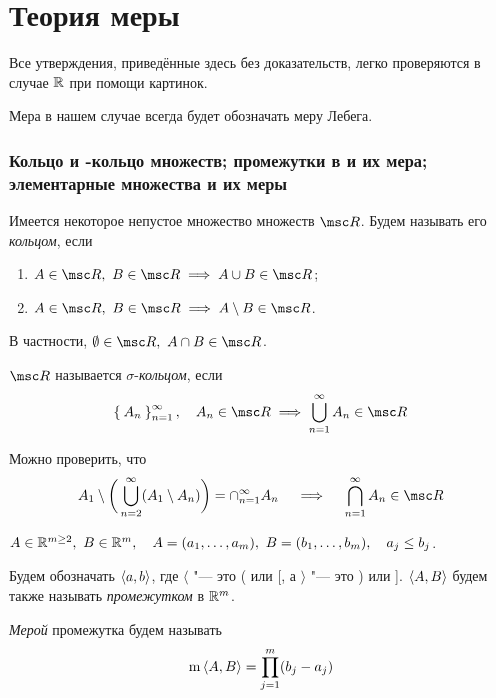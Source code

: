 \part{Теория меры}

Все утверждения, приведённые здесь без доказательств, легко проверяются в случае $ \mathbb{R} $ при помощи картинок.

Мера в нашем случае всегда будет обозначать меру Лебега.

\section{Кольцо и -кольцо множеств; промежутки в  и их мера; элементарные множества и их меры}

\begin{definition}
	Имеется некоторое непустое множество множеств $ \msc R $. Будем называть его \emph{кольцом}, если
	\begin{enumerate}
		\item $ A \in \msc R, ~ B \in \msc R \implies A \cup B \in \msc R $;
		\item $ A \in \msc R, ~ B \in \msc R \implies A \setminus B \in \msc R $.
	\end{enumerate}
\end{definition}

В частности, $ \O \in \msc R, ~ A \cap B \in \msc R $.

\begin{definition}
	$ \msc R $ называется $ \sigma $-\emph{кольцом}, если
	$$ \set{A_n}_{n = 1}^\infty, \quad A_n \in \msc R \implies \bigcup_{n = 1}^\infty A_n \in \msc R $$
\end{definition}

Можно проверить, что
$$ A_1 \setminus \bigg( \bigcup_{n = 2}^\infty (A_1 \setminus A_n) \bigg) = \cap_{n = 1}^\infty A_n \quad \implies \quad \bigcap_{n = 1}^\infty A_n \in \msc R $$

\begin{definition}
	$ A \in \mathbb{R}^{m \ge 2}, ~ B \in \mathbb{R}^m, \quad A = (a_1, \dots, a_m), ~ B = (b_1, \dots, b_m), \quad a_j \le b_j $.

	Будем обозначать $ \Braket{a, b} $, где $ \langle $ "--- это ( или [, а $ \rangle $ "--- это ) или ]. $ \Braket{A, B} $ будем также называть \emph{промежутком} в $ \mathbb{R}^m $.
\end{definition}

\begin{definition}
	\emph{Мерой} промежутка будем называть
	$$ \operatorname m \Braket{A, B} = \prod_{j = 1}^m (b_j - a_j) $$
\end{definition}

